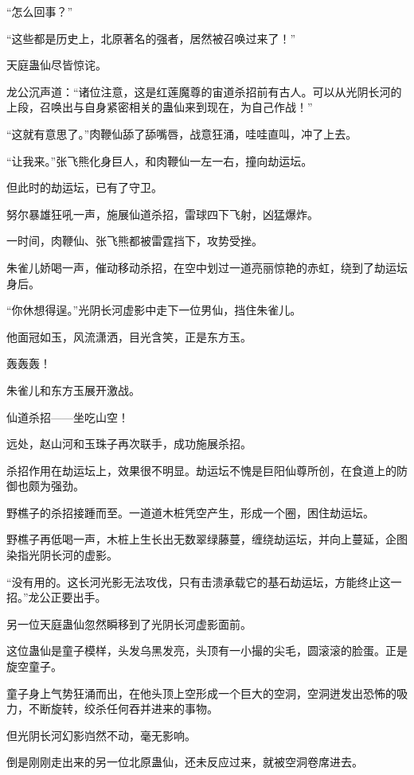 
\begin{this_body}

“怎么回事？”

“这些都是历史上，北原著名的强者，居然被召唤过来了！”

天庭蛊仙尽皆惊诧。

龙公沉声道：“诸位注意，这是红莲魔尊的宙道杀招前有古人。可以从光阴长河的上段，召唤出与自身紧密相关的蛊仙来到现在，为自己作战！”

“这就有意思了。”肉鞭仙舔了舔嘴唇，战意狂涌，哇哇直叫，冲了上去。

“让我来。”张飞熊化身巨人，和肉鞭仙一左一右，撞向劫运坛。

但此时的劫运坛，已有了守卫。

努尔暴雄狂吼一声，施展仙道杀招，雷球四下飞射，凶猛爆炸。

一时间，肉鞭仙、张飞熊都被雷霆挡下，攻势受挫。

朱雀儿娇喝一声，催动移动杀招，在空中划过一道亮丽惊艳的赤虹，绕到了劫运坛身后。

“你休想得逞。”光阴长河虚影中走下一位男仙，挡住朱雀儿。

他面冠如玉，风流潇洒，目光含笑，正是东方玉。

轰轰轰！

朱雀儿和东方玉展开激战。

仙道杀招——坐吃山空！

远处，赵山河和玉珠子再次联手，成功施展杀招。

杀招作用在劫运坛上，效果很不明显。劫运坛不愧是巨阳仙尊所创，在食道上的防御也颇为强劲。

野樵子的杀招接踵而至。一道道木桩凭空产生，形成一个圈，困住劫运坛。

野樵子再低喝一声，木桩上生长出无数翠绿藤蔓，缠绕劫运坛，并向上蔓延，企图染指光阴长河的虚影。

“没有用的。这长河光影无法攻伐，只有击溃承载它的基石劫运坛，方能终止这一招。”龙公正要出手。

另一位天庭蛊仙忽然瞬移到了光阴长河虚影面前。

这位蛊仙是童子模样，头发乌黑发亮，头顶有一小撮的尖毛，圆滚滚的脸蛋。正是旋空童子。

童子身上气势狂涌而出，在他头顶上空形成一个巨大的空洞，空洞迸发出恐怖的吸力，不断旋转，绞杀任何吞并进来的事物。

但光阴长河幻影岿然不动，毫无影响。

倒是刚刚走出来的另一位北原蛊仙，还未反应过来，就被空洞卷席进去。


\end{this_body}
